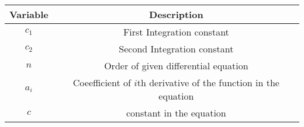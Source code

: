 \begin{tabular}[12pt]{ |c| c|}
    \hline
    \textbf{Variable} & \textbf{Description}\\ 
    \hline
    $c_1$ &First Integration constant\\
    \hline
    $c_2$ &Second Integration constant\\
    \hline
    $n$ & Order of given differential equation\\
    \hline
    $a_i$ & Coeefficient of $i$th derivative of the function in the equation\\
    \hline
    $c$ & constant in the equation\\
    \hline
    \end{tabular}
